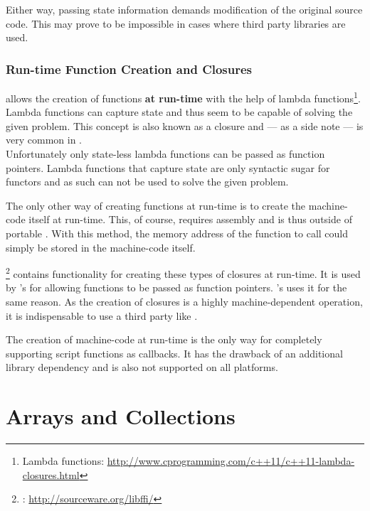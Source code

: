 Either way, passing state information demands modification of the original source code. This may prove to be impossible in cases where third party libraries are used.

\subsubsection{Run-time Function Creation and Closures}

 allows the creation of functions \textbf{at run-time} with the help of lambda functions\footnote{Lambda functions: \url{http://www.cprogramming.com/c++11/c++11-lambda-closures.html}}. Lambda functions can capture state and thus seem to be capable of solving the given problem. This concept is also known as a closure and --- as a side note --- is very common in .
\\Unfortunately only state-less lambda functions can be passed as function pointers. Lambda functions that capture state are only syntactic sugar for functors and as such can not be used to solve the given problem.

The only other way of creating functions at run-time is to create the machine-code itself at run-time. This, of course, requires assembly and is thus outside of portable . With this method, the memory address of the  function to call could simply be stored in the machine-code itself.

\footnote{: \url{http://sourceware.org/libffi/}} contains functionality for creating these types of closures at run-time. It is used by 's  for allowing  functions to be passed as  function pointers. 's  uses it for the same reason. As the creation of closures is a highly machine-dependent operation, it is indispensable to use a third party like .

The creation of machine-code at run-time is the only way for completely supporting script functions as callbacks. It has the drawback of an additional library dependency and is also not supported on all platforms.

\section{Arrays and Collections}

